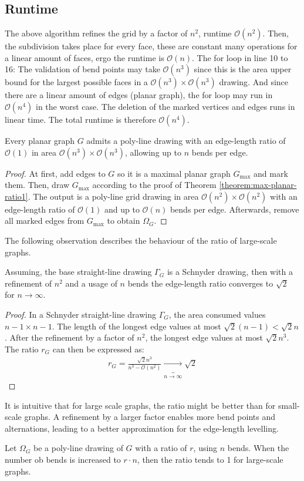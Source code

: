 \subsection{Runtime}
The above algorithm refines the grid by a factor of $n^2$, runtime $\mathcal{O}(n^2)$. Then, the subdivision takes place for every face, these are constant many operations for a linear amount of faces, ergo the runtime is $\mathcal{O}(n)$. The for loop in line 10 to 16: The validation of bend points may take $\mathcal{O}(n^3)$ since this is the area upper bound for the largest possible faces in a $\mathcal{O}(n^3)\times\mathcal{O}(n^3)$ drawing. And since there are a linear amount of edges (planar graph), the for loop may run in $\mathcal{O}(n^4)$ in the worst case. The deletion of the marked vertices and edges runs in linear time. The total runtime is therefore $\mathcal{O}(n^4)$.
\begin{theorem}
\end{theorem}
Every planar graph $G$ admits a poly-line drawing with an edge-length ratio of $\mathcal{O}(1)$ in area $\mathcal{O}(n^3)\times \mathcal{O}(n^3)$, allowing up to $n$ bends per edge.
\begin{proof}
	At first, add edges to $G$ so it is a maximal planar graph $G_{\max}$ and mark them. Then, draw $G_{\max}$ according to the proof of Theorem \ref{theorem:max-planar-ratio1}. The output is a poly-line grid drawing in area $\mathcal{O}(n^2)\times \mathcal{O}(n^2)$ with an edge-length ratio of $\mathcal{O}(1)$ and up to $\mathcal{O}(n)$ bends per edge. Afterwards, remove all marked edges from $G_{\max}$ to obtain $\Omega_G$.
\end{proof}

The following observation describes the behaviour of the ratio of large-scale graphs.
\begin{observation}
\end{observation}
Assuming, the base straight-line drawing $\Gamma_G$ is a Schnyder drawing, then with a refinement of $n^2$ and a usage of $n$ bends the edge-length ratio converges to $\sqrt{2}$ for $n \to \infty$.
\begin{proof}
	In a Schnyder straight-line drawing $\Gamma_G$, the area consumed values $n-1\times n-1$. The length of the longest edge values at most $\sqrt{2}(n-1) < \sqrt{2}n$. After the refinement by a factor of $n^2$, the longest edge values at most $\sqrt{2}n^3$. The ratio $r_G$ can then be expressed as:
	\begin{align*}
		r_G = \frac{\sqrt{2}n^3}{n^3-\mathcal{O}(n^2)} \underbrace{\rightarrow}_{n\to\infty} \sqrt{2}
	\end{align*}
\end{proof}
It is intuitive that for large scale graphs, the ratio might be better than for small-scale graphs. A refinement by a larger factor enables more bend points and alternations, leading to a better approximation for the edge-length levelling.
\begin{observation}
\end{observation}
Let $\Omega_G$ be a poly-line drawing of $G$ with a ratio of $r$, using $n$ bends. When the number ob bends is increased to $r\cdot n$, then the ratio tends to 1 for large-scale graphs.

